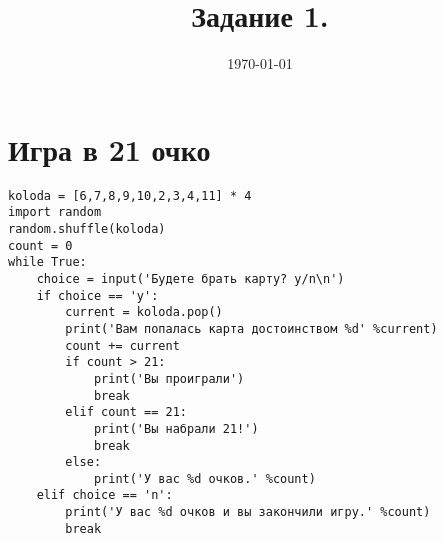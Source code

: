 \documentclass[12pt, a4paper]{article}
\title{Задание 1.}
\date{\today}
\begin{document}
\maketitle
\section{Игра в 21 очко}
\begin{verbatim}
koloda = [6,7,8,9,10,2,3,4,11] * 4
import random
random.shuffle(koloda)
count = 0
while True:
    choice = input('Будете брать карту? y/n\n')
    if choice == 'y':
        current = koloda.pop()
        print('Вам попалась карта достоинством %d' %current)
        count += current
        if count > 21:
            print('Вы проиграли')
            break
        elif count == 21:
            print('Вы набрали 21!')
            break
        else:
            print('У вас %d очков.' %count)
    elif choice == 'n':
        print('У вас %d очков и вы закончили игру.' %count)
        break
\end{verbatim}
\end{document}
